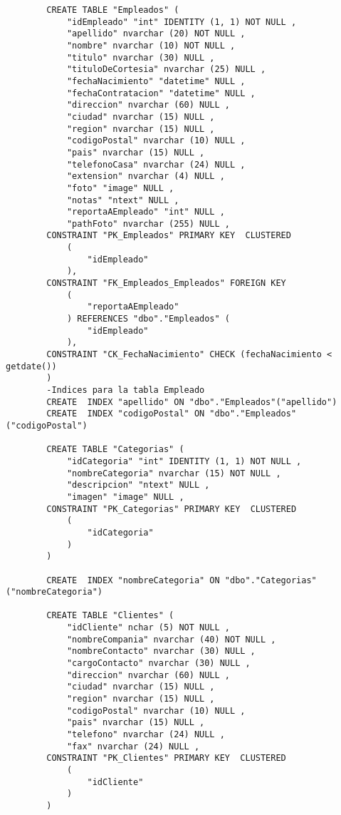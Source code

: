 \documentclass[12pt, letterpaper]{article}
\begin{document}
{\begin{lstlisting}
        CREATE TABLE "Empleados" (
            "idEmpleado" "int" IDENTITY (1, 1) NOT NULL ,
            "apellido" nvarchar (20) NOT NULL ,
            "nombre" nvarchar (10) NOT NULL ,
            "titulo" nvarchar (30) NULL ,
            "tituloDeCortesia" nvarchar (25) NULL ,
            "fechaNacimiento" "datetime" NULL ,
            "fechaContratacion" "datetime" NULL ,
            "direccion" nvarchar (60) NULL ,
            "ciudad" nvarchar (15) NULL ,
            "region" nvarchar (15) NULL ,
            "codigoPostal" nvarchar (10) NULL ,
            "pais" nvarchar (15) NULL ,
            "telefonoCasa" nvarchar (24) NULL ,
            "extension" nvarchar (4) NULL ,
            "foto" "image" NULL ,
            "notas" "ntext" NULL ,
            "reportaAEmpleado" "int" NULL ,
            "pathFoto" nvarchar (255) NULL ,
        CONSTRAINT "PK_Empleados" PRIMARY KEY  CLUSTERED
            (
                "idEmpleado"
            ),
        CONSTRAINT "FK_Empleados_Empleados" FOREIGN KEY
            (
                "reportaAEmpleado"
            ) REFERENCES "dbo"."Empleados" (
                "idEmpleado"
            ),
        CONSTRAINT "CK_FechaNacimiento" CHECK (fechaNacimiento < getdate())
        )
        -Indices para la tabla Empleado
        CREATE  INDEX "apellido" ON "dbo"."Empleados"("apellido")
        CREATE  INDEX "codigoPostal" ON "dbo"."Empleados"("codigoPostal")

        CREATE TABLE "Categorias" (
            "idCategoria" "int" IDENTITY (1, 1) NOT NULL ,
            "nombreCategoria" nvarchar (15) NOT NULL ,
            "descripcion" "ntext" NULL ,
            "imagen" "image" NULL ,
        CONSTRAINT "PK_Categorias" PRIMARY KEY  CLUSTERED
            (
                "idCategoria"
            )
        )
        
        CREATE  INDEX "nombreCategoria" ON "dbo"."Categorias"("nombreCategoria")

        CREATE TABLE "Clientes" (
            "idCliente" nchar (5) NOT NULL ,
            "nombreCompania" nvarchar (40) NOT NULL ,
            "nombreContacto" nvarchar (30) NULL ,
            "cargoContacto" nvarchar (30) NULL ,
            "direccion" nvarchar (60) NULL ,
            "ciudad" nvarchar (15) NULL ,
            "region" nvarchar (15) NULL ,
            "codigoPostal" nvarchar (10) NULL ,
            "pais" nvarchar (15) NULL ,
            "telefono" nvarchar (24) NULL ,
            "fax" nvarchar (24) NULL ,
        CONSTRAINT "PK_Clientes" PRIMARY KEY  CLUSTERED
            (
                "idCliente"
            )
        )
        

\end{lstlisting}}
\end{document}
